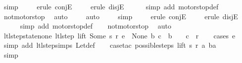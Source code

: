 \begin{isabellebody}
\ simp\isanewline
\ \ \ \isamarkupfalse%
\ {\isacharparenleft}erule\ conjE{\isacharparenright}\isanewline
\ \ \ \isamarkupfalse%
\ {\isacharparenleft}erule\ disjE{\isacharparenright}\isanewline
\ \ \ \ \isamarkupfalse%
\ {\isacharparenleft}simp\ add{\isacharcolon}\ motorstop{}{\isacharunderscore}def{\isacharparenright}\isanewline
\ \ \isamarkupfalse%
\ not{\isacharunderscore}motorstop\ \isamarkupfalse%
\ auto{\isacharbrackleft}{}{\isacharbrackright}\isanewline
\ \ \ \isamarkupfalse%
\ auto{\isacharbrackleft}{}{\isacharbrackright}\isanewline
\ \ \ \isamarkupfalse%
\ simp\isanewline
\ \ \ \isamarkupfalse%
\ {\isacharparenleft}erule\ conjE{\isacharparenright}\isanewline
\ \ \ \isamarkupfalse%
\ {\isacharparenleft}erule\ disjE{\isacharparenright}\isanewline
\ \ \ \ \isamarkupfalse%
\ {\isacharparenleft}simp\ add{\isacharcolon}\ motorstop{}{\isacharunderscore}def{\isacharparenright}\isanewline
\ \ \isamarkupfalse%
\ not{\isacharunderscore}motorstop\ \isamarkupfalse%
\ auto%
\endisatagproof
{\isafoldproof}%
%
\isadelimproof
\isanewline
%
\endisadelimproof
\isanewline
{}\isamarkupfalse%
\ ltl{\isacharunderscore}step{\isacharunderscore}state{\isacharunderscore}none{\isacharcolon}\ {\isachardoublequoteopen}{\isacharparenleft}ltl{\isacharunderscore}step\ lift\ {\isacharparenleft}Some\ s{\isacharparenright}\ r\ e\ {\isacharequal}\ {\isacharparenleft}None{\isacharcomma}\ b{\isacharcomma}\ c{\isacharparenright}{\isacharparenright}\ {\isasymLongrightarrow}\ b\ {\isacharequal}\ {\isacharbrackleft}{\isacharbrackright}\ {\isasymand}\ c\ {\isacharequal}\ r{\isachardoublequoteclose}\isanewline
%
\isadelimproof
\ \ %
\endisadelimproof
%
\isatagproof
{}\isamarkupfalse%
\ {\isacharparenleft}cases\ e{\isacharparenright}\isanewline
\ \ \isamarkupfalse%
\ {\isacharparenleft}simp\ add{\isacharcolon}\ ltl{\isacharunderscore}step{\isachardot}simps\ Let{\isacharunderscore}def{\isacharparenright}\isanewline
\ \ \isamarkupfalse%
\ {\isacharparenleft}case{\isacharunderscore}tac\ {\isachardoublequoteopen}possible{\isacharunderscore}steps\ lift\ s\ r\ a\ ba\ {\isacharequal}\ {\isacharbraceleft}{\isacharbar}{\isacharbar}{\isacharbraceright}{\isachardoublequoteclose}{\isacharparenright}\isanewline
\ \ \ \isamarkupfalse%
\ simp\isanewline
\ \ \isamarkupfalse%

\end{isabellebody}
